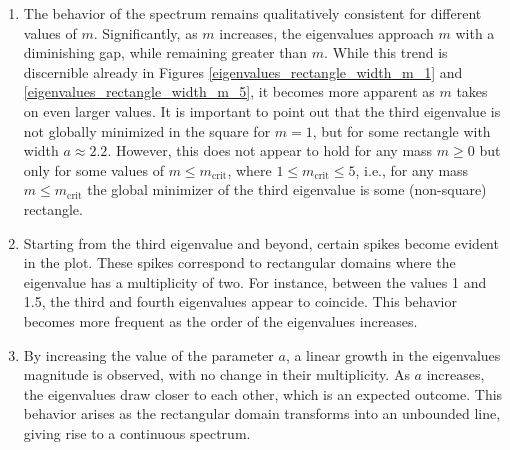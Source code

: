 \begin{enumerate}
  \item \label{dirac_sim_quad_point_1} The behavior of the spectrum remains qualitatively consistent for different values of \(m\). Significantly, as \(m\) increases, the eigenvalues approach \(m\) with a diminishing gap, while remaining greater than \(m\). While this trend is discernible already in Figures \ref{eigenvalues_rectangle_width_m_1} and \ref{eigenvalues_rectangle_width_m_5}, it becomes more apparent as \(m\) takes on even larger values. It is important to point out that the third eigenvalue is not globally minimized in the square for \(m=1\), but for some rectangle with width \(a \approx 2.2\). However, this does not appear to hold for any mass \(m \geq 0\) but only for some values of \(m \leq m_{\text{crit}}\), where \(1 \leq m_{\text{crit}} \leq 5\), i.e., for any mass \(m \leq m_{\text{crit}}\) the global minimizer of the third eigenvalue is some (non-square) rectangle.
  
  \item \label{dirac_sim_quad_point_2}  Starting from the third eigenvalue and beyond, certain spikes become evident in the plot. These spikes correspond to rectangular domains where the eigenvalue has a multiplicity of two. For instance, between the values 1 and 1.5, the third and fourth eigenvalues appear to coincide. This behavior becomes more frequent as the order of the eigenvalues increases.
  
  \item \label{dirac_sim_quad_point_3} By increasing the value of the parameter \(a\), a linear growth in the eigenvalues magnitude is observed, with no change in their multiplicity. As \(a\) increases, the eigenvalues draw closer to each other, which is an expected outcome. This behavior arises as the rectangular domain transforms into an unbounded line, giving rise to a continuous spectrum.
\end{enumerate}

